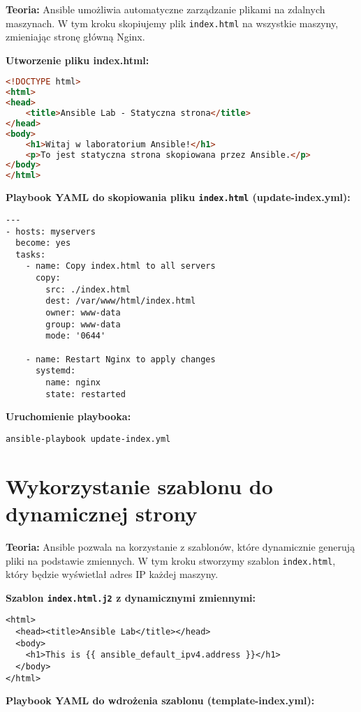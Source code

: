 \documentclass{article}
\begin{document}
\textbf{Teoria:}  
Ansible umożliwia automatyczne zarządzanie plikami na zdalnych maszynach. W tym kroku skopiujemy plik \texttt{index.html} na wszystkie maszyny, zmieniając stronę główną Nginx.

\textbf{Utworzenie pliku index.html:}
\begin{lstlisting}[language=html]
<!DOCTYPE html>
<html>
<head>
    <title>Ansible Lab - Statyczna strona</title>
</head>
<body>
    <h1>Witaj w laboratorium Ansible!</h1>
    <p>To jest statyczna strona skopiowana przez Ansible.</p>
</body>
</html>
\end{lstlisting}

\textbf{Playbook YAML do skopiowania pliku \texttt{index.html} (update-index.yml):}

\begin{lstlisting}
---
- hosts: myservers
  become: yes
  tasks:
    - name: Copy index.html to all servers
      copy:
        src: ./index.html
        dest: /var/www/html/index.html
        owner: www-data
        group: www-data
        mode: '0644'
        
    - name: Restart Nginx to apply changes
      systemd:
        name: nginx
        state: restarted
\end{lstlisting}

\textbf{Uruchomienie playbooka:}

\noindent\begin{lstlisting}
ansible-playbook update-index.yml
\end{lstlisting}

\section{Wykorzystanie szablonu do dynamicznej strony}

\textbf{Teoria:}  
Ansible pozwala na korzystanie z szablonów, które dynamicznie generują pliki na podstawie zmiennych. W tym kroku stworzymy szablon \texttt{index.html}, który będzie wyświetlał adres IP każdej maszyny.

\textbf{Szablon \texttt{index.html.j2} z dynamicznymi zmiennymi:}

\noindent\begin{lstlisting}
<html>
  <head><title>Ansible Lab</title></head>
  <body>
    <h1>This is {{ ansible_default_ipv4.address }}</h1>
  </body>
</html>
\end{lstlisting}

\textbf{Playbook YAML do wdrożenia szablonu (template-index.yml):}
\end{document}
